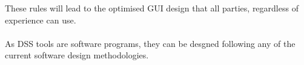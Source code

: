 \documentclass[table,a4paper,oneside]{book}
\begin{document}
These rules will lead to the optimised \ac{GUI} design that all parties, regardless of experience can use.
\\
\\
As \ac{DSS} tools are software programs, they can be desgned following any of the current software design methodologies.




\end{document}
